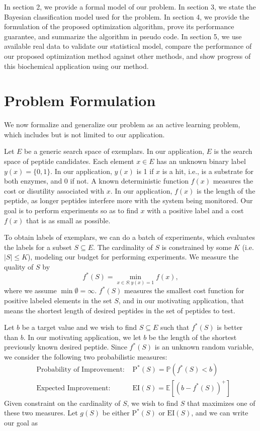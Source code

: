 \documentclass[opre,nonblindrev]{informs3} %
\newcommand{\E}{\mathbb{E}}
\newcommand{\EI}{\mathrm{EI}}
\newcommand{\PI}{\text{P}^*}
\begin{document}
In section 2, we provide a formal model of our problem.  In section 3, we state the Bayesian classification model used for the problem. In section 4, we provide the formulation of the proposed optimization algorithm, prove its performance guarantee, and summarize the algorithm in pseudo code. In section 5, we use available real data to validate our statistical model, compare the performance of our proposed optimization method against
other methods, and show progress of this biochemical application using our method.

\section{Problem Formulation} \label{sec:problem}

We now formalize and generalize our problem as an active learning problem, which includes but is not limited to our application.

Let $E$ be a generic search space of exemplars.  In our application, $E$ is the search space of peptide candidates. Each element $x \in E$ has an unknown binary label $y(x)=\{0,1\}$.  In our application, $y(x)$ is 1 if $x$ is a hit, i.e., is a substrate for both enzymes, and 0 if not.
A known deterministic function $f(x)$ measures the cost or disutility associated with $x$.  In our application, $f(x)$ is the length of the peptide, as longer peptides interfere more with the system being monitored. Our goal is to perform experiments so as to find $x$ with a positive label and a cost $f(x)$ that is as small as
possible.

To obtain labels of exemplars, we can do a batch of experiments, which evaluates the labels for a subset $S \subseteq E$. The cardinality of $S$ is constrained by some $K$ (i.e. $|S| \leq K$), modeling our budget for performing experiments. We measure the quality of $S$ by 
\begin{equation} \label{eq:fS}
f^*(S)= \underset{x \in S:y(x)=1}{\min} f(x),
\end{equation}
where we assume $\min \emptyset = \infty$. $f^*(S)$ measures the smallest cost function for positive labeled elements in the set $S$, and in our motivating application, that means the shortest length of desired peptides in the set of peptides to test.


Let $b$ be a target value and we wish to find $S\subseteq E$ such that $f^*(S)$ is better than $b$. In our motivating application, we let $b$ be the length of the shortest previously known desired peptide. Since $f^*(S)$ is an unknown random variable, we consider the following two probabilistic measures:
\begin{equation} \label{eq:twomeasure}
  \begin{aligned}
    &\text{Probability of Improvement: }&\PI(S) = \mathbb{P}(f^*(S) < b)\\
    &\text{Expected Improvement: }&\EI(S) = \E [(b-f^*(S))^+]
  \end{aligned}
\end{equation}
Given constraint on the cardinality of $S$, we wish to find $S$ that maximizes one of these two measures. Let $g(S)$ be either $\PI(S)$ or $\EI(S)$, and we can write our goal as
\end{document}
